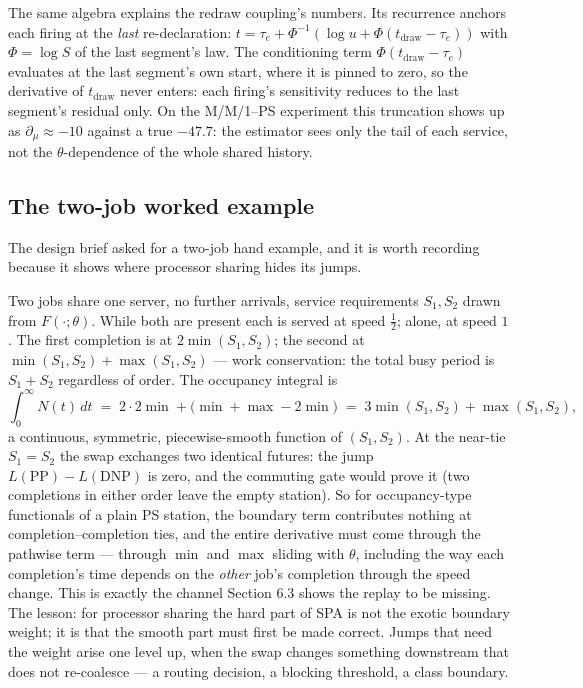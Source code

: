 \documentclass[11pt]{article}
\begin{document}
The same algebra explains the redraw coupling's numbers. Its recurrence
anchors each firing at the \emph{last} re-declaration:
$t = \tau_e + \Phi^{-1}(\log u + \Phi(t_{\mathrm{draw}} - \tau_e))$ with
$\Phi = \log S$ of the last segment's law. The conditioning term
$\Phi(t_{\mathrm{draw}} - \tau_e)$ evaluates at the last segment's own
start, where it is pinned to zero, so the derivative of
$t_{\mathrm{draw}}$ never enters: each firing's sensitivity reduces to
the last segment's residual only. On the M/M/1--PS experiment this
truncation shows up as $\partial_\mu \approx -10$ against a true
$-47.7$: the estimator sees only the tail of each service, not the
$\theta$-dependence of the whole shared history.

\subsection{The two-job worked example}

The design brief asked for a two-job hand example, and it is worth
recording because it shows where processor sharing hides its jumps.

Two jobs share one server, no further arrivals, service requirements
$S_1, S_2$ drawn from $F(\cdot;\theta)$. While both are present each is
served at speed $\tfrac12$; alone, at speed $1$. The first completion is
at $2\min(S_1,S_2)$; the second at $\min(S_1,S_2) + \max(S_1,S_2)$ ---
work conservation: the total busy period is $S_1 + S_2$ regardless of
order. The occupancy integral is
\[
\int_0^\infty N(t)\,dt
\;=\;
2 \cdot 2\min + \bigl(\min + \max - 2\min\bigr)
\;=\;
3\min(S_1,S_2) + \max(S_1,S_2),
\]
a continuous, symmetric, piecewise-smooth function of $(S_1, S_2)$. At
the near-tie $S_1 = S_2$ the swap exchanges two identical futures: the
jump $L(\mathrm{PP}) - L(\mathrm{DNP})$ is zero, and the commuting gate
would prove it (two completions in either order leave the empty
station). So for occupancy-type functionals of a plain PS station, the
boundary term contributes nothing at completion--completion ties, and
the entire derivative must come through the pathwise term --- through
$\min$ and $\max$ sliding with $\theta$, including the way each
completion's time depends on the \emph{other} job's completion through
the speed change. This is exactly the channel Section 6.3 shows the
replay to be missing. The lesson: for processor sharing the hard part of
SPA is not the exotic boundary weight; it is that the smooth part must
first be made correct. Jumps that need the weight arise one level up,
when the swap changes something downstream that does not re-coalesce ---
a routing decision, a blocking threshold, a class boundary.
\end{document}
